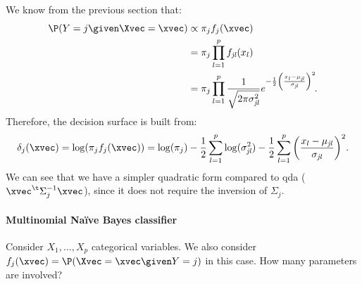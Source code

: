 We know from the previous section that:
\begin{equation}
    \begin{aligned}
        \P(Y = j \given \Xvec = \xvec) & \propto \pi_j f_j(\xvec)                                                                                                                                             \\
                                       & = \pi_j \prod_{l = 1}^p f_{\mathit{jl}}(x_l)                                                                                                                                  \\
                                       & = \pi_j \prod_{l = 1}^p \frac{1}{\sqrt{2\pi\sigma_{\mathit{jl}}^2}}e^{-\frac{1}{2}\left(\frac{x_l - \mu_{\mathit{jl}}}{\sigma_{\mathit{jl}}}\right)^2}\negthinspace.
    \end{aligned}
\end{equation}
Therefore, the decision surface is built from:
\begin{equation}
    \delta_j(\xvec) = \log(\pi_jf_j(\xvec)) = \log(\pi_j) - \frac{1}{2}\sum_{l = 1}^p \log(\sigma_{\mathit{jl}}^2) - \frac{1}{2}\sum_{l = 1}^p \left(\frac{x_l - \mu_{\mathit{jl}}}{\sigma_{\mathit{jl}}}\right)^2\negthinspace.
\end{equation}
We can see that we have a simpler quadratic form compared to \acs{qda} ($\xvec^\t\Sigma_j^{-1}\xvec$), since it does not require the inversion of $\Sigma_j$.

\paragraph{Multinomial Na\"ive Bayes classifier}

Consider $X_1,\ldots, X_p$ categorical variables. We also consider $f_j(\xvec) = \P(\Xvec = \xvec \given Y = j)$ in this case. How many parameters are involved?

